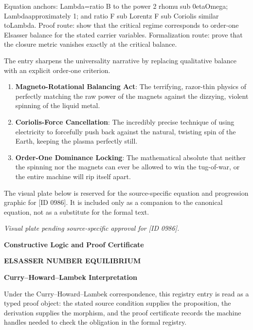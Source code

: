 Equation anchors: Lambda=ratio B to the power 2 rhomu sub 0etaOmega; Lambdaapproximately 1; and ratio F sub Lorentz F sub Coriolis similar toLambda. Proof route: show that the critical regime corresponds to order-one Elsasser balance for the stated carrier variables. Formalization route: prove that the closure metric vanishes exactly at the critical balance.

The entry sharpens the universality narrative by replacing qualitative balance with an explicit order-one criterion.
\endgroup

\begin{enumerate}[leftmargin=1.6em,itemsep=6pt,topsep=4pt]
\item \textbf{Magneto-Rotational Balancing Act}: The terrifying, razor-thin physics of perfectly matching the raw power of the magnets against the dizzying, violent spinning of the liquid metal.
\item \textbf{Coriolis-Force Cancellation}: The incredibly precise technique of using electricity to forcefully push back against the natural, twisting spin of the Earth, keeping the plasma perfectly still.
\item \textbf{Order-One Dominance Locking}: The mathematical absolute that neither the spinning nor the magnets can ever be allowed to win the tug-of-war, or the entire machine will rip itself apart.
\end{enumerate}

\begingroup\footnotesize\sloppy
The visual plate below is reserved for the source-specific equation and progression graphic for [ID 0986]. It is included only as a companion to the canonical equation, not as a substitute for the formal text.
\par\endgroup
\begingroup\footnotesize\itshape
Visual plate pending source-specific approval for [ID 0986].
\par\endgroup

\clearpage
\begingroup\tzpsupportsetup
\noindent\textbf{\fontsize{10.8pt}{12.8pt}\selectfont [ID 0986] Constructive Logic and Proof Certificate}\par
\noindent\textbf{\fontsize{10pt}{12pt}\selectfont ELSASSER NUMBER EQUILIBRIUM}\par
\vspace{0.45em}
\begingroup
\footnotesize
\setlength{\parskip}{0.22em}
\setlength{\parindent}{0pt}
\noindent\textbf{Curry--Howard--Lambek Interpretation}\par
Under the Curry--Howard--Lambek correspondence, this registry entry is read as a typed proof
object: the stated source condition supplies the proposition, the derivation supplies the
morphism, and the proof certificate records the machine handles needed to check the obligation
in the formal registry.

